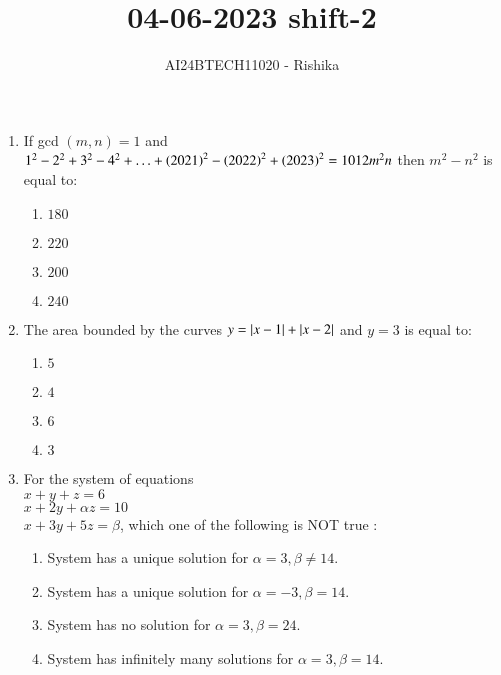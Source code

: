 \documentclass[journal,12pt,onecolumn]{IEEEtran}
\theoremstyle{remark}
\begin{document}

\vspace{3cm}

\title{04-06-2023 shift-2}
\author{AI24BTECH11020 - Rishika}
\maketitle
\bigskip
\renewcommand{\thefigure}{\theenumi}
\renewcommand{\thetable}{\theenumi}
\begin{enumerate}
	\item If gcd $(m, n) = 1$ and $1^2 - 2^2 + 3^2 - 4^2 + \ldots + \left(2021\right)^2 - \left(2022\right)^2 + \left(2023\right)^2 = 1012 m^2n$ then $m^2 - n^2$ is equal to:
    \begin{enumerate}
        \item $180$
        \item $220$
        \item $200$
        \item $240$
    \end{enumerate}
\item The area bounded by the curves $y = \left\vert x - 1 \right\vert + \left\vert x - 2\right\vert $ and $y = 3$ is equal to:
    \begin{enumerate}
        \item $5$
        \item $4$
        \item $6$
        \item $3$
    \end{enumerate}                                   
\item For the system of equations \\                  
          $x+y+z=6$\\ $x+2y+ \alpha z=10 $ \\ $x+3y+5z=\beta $, which one of the following is NOT true :                                            
    \begin{enumerate}                                                            
        \item System has a unique solution for $\alpha =3, \beta \neq 14.$                            
        \item System has a unique solution for $\alpha = -3, \beta =14.$ 
        \item System has no solution for $\alpha =3, \beta =24.$ 
        \item System has infinitely many solutions for $\alpha =3, \beta =14.$                        
    \end{enumerate}                          

\end{enumerate}
\end{document}
